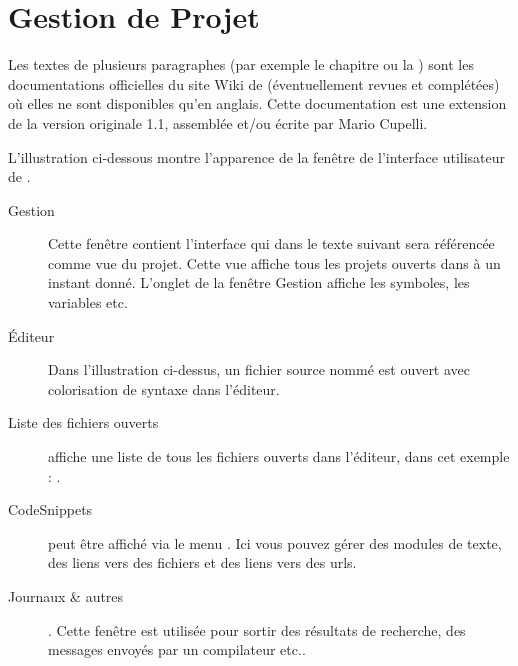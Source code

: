 \chapter{Gestion de Projet \codeblocks}

Les textes de plusieurs paragraphes (par exemple le chapitre  ou la ) sont les documentations officielles du site Wiki de \codeblocks (éventuellement revues et complétées) où elles ne sont disponibles qu'en anglais.
Cette documentation est une extension de la version originale 1.1, assemblée et/ou écrite par Mario Cupelli.


L'illustration ci-dessous montre l'apparence de la fenêtre de l'interface utilisateur de \codeblocks.


\begin{description}
\item[Gestion] Cette fenêtre contient l'interface  qui dans le texte suivant sera référencée comme vue du projet. Cette vue affiche tous les projets ouverts dans \codeblocks à un instant donné. L'onglet  de la fenêtre Gestion affiche les symboles, les variables etc.
\item[Éditeur] Dans l'illustration ci-dessus, un fichier source nommé  est ouvert avec colorisation de syntaxe dans l'éditeur.
\item[Liste des fichiers ouverts] affiche une liste de tous les fichiers ouverts dans l'éditeur, dans cet exemple : .
\item[CodeSnippets] peut être affiché via le menu . Ici vous pouvez gérer des modules de texte, des liens vers des fichiers et des liens vers des urls.
\item[Journaux \& autres]. Cette fenêtre est utilisée pour sortir des résultats de recherche, des messages envoyés par un compilateur etc..
\end{description}

